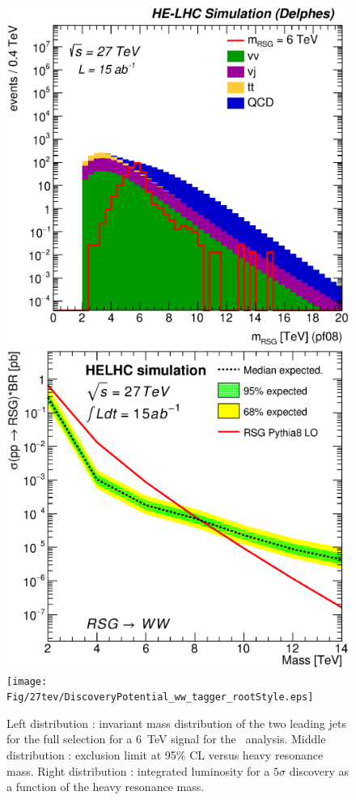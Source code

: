 \begin{figure}[!htb]
  \centering
  \includegraphics[width=0.30\columnwidth]{Fig/27tev/RSGWW_Mj1j2_pf08_fit_sel4_nostack_log.eps}
  \includegraphics[width=0.30\columnwidth]{Fig/27tev/lim_RSGraviton_ww_helhc_v01.eps}
  \texttt{[image: Fig/27tev/DiscoveryPotential\_ww\_tagger\_rootStyle.eps]}
  \caption{Left distribution : invariant mass distribution of the two leading jets for the full selection for a 6~TeV signal for the \rsg\ analysis. Middle distribution : exclusion limit at 95\% CL versus heavy resonance mass. Right distribution : integrated luminosity for a $5\sigma$ discovery as a function of the heavy resonance mass.}
  \label{figure:hadronicresonances27:wwsel04}
\end{figure}

\begin{table}[!htb]\centering
{}
\caption{Final yield of \rsg\ analysis.}
\label{tab:RSGwwYield27}
\end{table}

